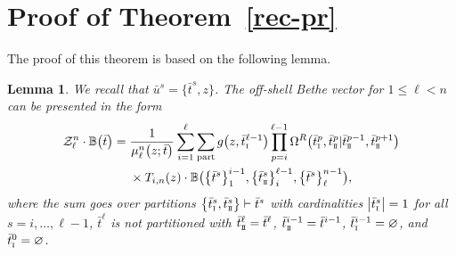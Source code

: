 \documentclass[pdftex]{sigma}
\newcommand{\so}{\scriptscriptstyle \rm I}
\newcommand{\st}{\scriptscriptstyle \rm I\hspace{-1pt}I}
\newcommand{\bu}{\bar u}
\newcommand{\bt}{{\bar t}}
\newtheorem{lem}[thm]{Lemma}
\theoremstyle{definition}
\def\BB{{\mathbb{B}}}
\def\Z{\mathcal{Z}}
\def\Omr{\Omega^R}
\begin{document}
\appendix

\section[Proof of the Theorem 3.1]{Proof of Theorem~\ref{rec-pr}}\label{ApA}

The proof of this theorem is based on the following lemma.
\begin{lem}\label{l-pr}
We recall that $\bar u^s=\bigl\{\bar t^s,z\bigr\}$.
The off-shell Bethe vector
\smash{$\BB\bigl(\bigl\{\bt^s\bigr\}_1^{\ell-1},\bigl\{\bu^s\bigr\}_\ell^{n-1}\bigr)$} for $1\leq \ell< n$
can be presented in the form
\begin{align}
\Z_{\ell}^n\cdot \BB\bigl(\bt\bigr)={}&
\frac{1}{\mu_\ell^n\bigl(z;\bt\bigr)}
\sum_{i=1}^\ell \sum_{\rm part} g\bigl(z,\bt^{\ell-1}_{\so}\bigr)
\prod_{p=i}^{\ell-1}\Omr\bigl(\bt^p_{\so},\bt^p_{\st}|\bt^{p-1}_{\st},\bt^{p+1}_{\st}\bigr)\nonumber
\\
&\times T_{i,n}(z)\cdot\BB\bigl(\bigl\{\bt^s\bigr\}_1^{i-1},\bigl\{\bt^s_{\st}\bigr\}_i^{\ell-1},
\bigl\{\bt^s\bigr\}_\ell^{n-1}\bigr) ,\label{Az8}
\end{align}
where the sum goes over partitions $\bigl\{\bt^s_{\so},\bt^s_{\st}\bigr\}\vdash\bt^s$
with cardinalities $\big|\bt^s_{\so}\big|=1$ for all $s=i,\dots,\ell-1$, $\bt^\ell$ is not
 partitioned with $\bt^\ell_{\st}=\bt^\ell$, $\bt^{i-1}_{\st} = \bt^{i-1}$, $\bt^{i-1}_{\so} = \varnothing$, and $\bt^0_{\so} = \varnothing$.
\end{lem}
\end{document}
